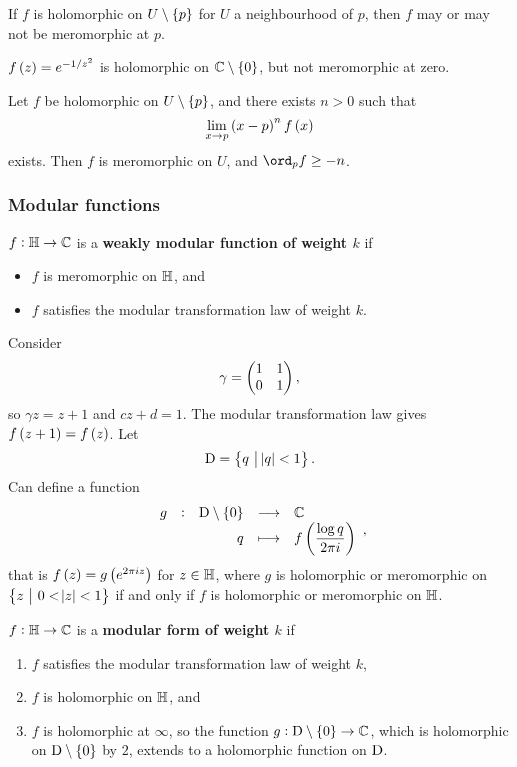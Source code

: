 If $ f $ is holomorphic on $ U \setminus \cbr{p} $ for $ U $ a neighbourhood of $ p $, then $ f $ may or may not be meromorphic at $ p $.

\begin{example*}
$ f\br{z} = e^{-1 / z^2} $ is holomorphic on $ \CC \setminus \cbr{0} $, but not meromorphic at zero.
\end{example*}

\begin{theorem}
Let $ f $ be holomorphic on $ U \setminus \cbr{p} $, and there exists $ n > 0 $ such that
$$ \lim_{x \to p} \br{x - p}^nf\br{x} $$
exists. Then $ f $ is meromorphic on $ U $, and $ \ord_p f \ge -n $.
\end{theorem}

\pagebreak

\subsubsection{Modular functions}

\begin{definition}
$ f : \mathbb{H} \to \mathbb{C} $ is a \textbf{weakly modular function of weight $ k $} if
\begin{itemize}
\item $ f $ is meromorphic on $ \mathbb{H} $, and
\item $ f $ satisfies the modular transformation law of weight $ k $.
\end{itemize}
\end{definition}

Consider
$$ \gamma = \begin{pmatrix} 1 & 1 \\ 0 & 1 \end{pmatrix}, $$
so $ \gamma z = z + 1 $ and $ cz + d = 1 $. The modular transformation law gives $ f\br{z + 1} = f\br{z} $. Let
$$ \D = \cbr{q \st \abs{q} < 1}. $$
Can define a function
$$ \function[g]{\D \setminus \cbr{0}}{\CC}{q}{f\br{\dfrac{\log q}{2\pi i}}}, $$
that is $ f\br{z} = g\br{e^{2\pi iz}} $ for $ z \in \mathbb{H} $, where $ g $ is holomorphic or meromorphic on $ \cbr{z \st 0 < \abs{z} < 1} $ if and only if $ f $ is holomorphic or meromorphic on $ \mathbb{H} $.

\begin{definition}
$ f : \mathbb{H} \to \mathbb{C} $ is a \textbf{modular form of weight $ k $} if
\begin{enumerate}
\item $ f $ satisfies the modular transformation law of weight $ k $,
\item $ f $ is holomorphic on $ \mathbb{H} $, and
\item $ f $ is holomorphic at $ \infty $, so the function $ g : \D \setminus \cbr{0} \to \CC $, which is holomorphic on $ \D \setminus \cbr{0} $ by $ 2 $, extends to a holomorphic function on $ \mathrm{D} $.
\end{enumerate}
\end{definition}


